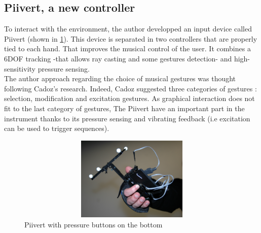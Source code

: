 \subsection{Piivert, a new controller}

To interact with the environment, the author developped an input device called Piivert (shown in \ref{fig:piivert}). This device is separated in two controllers that are properly tied to each hand. That improves the musical control of the user. It combines a 6DOF tracking -that allows ray casting and some gestures detection- and high-sensitivity pressure sensing.\\
The author approach regarding the choice of musical gestures was thought following Cadoz's \cite{cadoz1999musique} research. Indeed, Cadoz suggested three categories of gestures : selection, modification and excitation gestures. As graphical interaction does not fit to the last category of gestures, The Piivert have an important part in the instrument thanks to its pressure sensing and vibrating feedback (i.e excitation can be used to trigger sequences).

\begin{figure}[h!]
\centering\includegraphics[width=14cm,height=4cm]{image/piivert.jpg}
\caption{Piivert with pressure buttons on the bottom}
\label{fig:piivert}
\end{figure} 